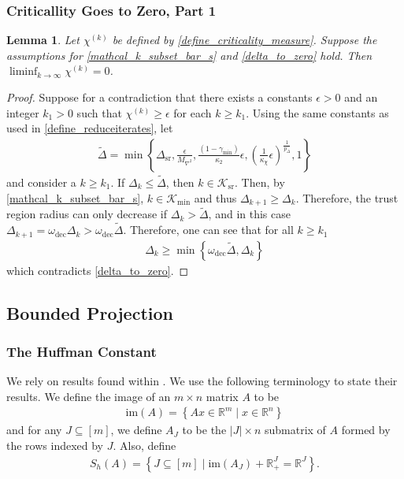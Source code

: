 \documentclass{article}
\newtheorem{lemma}[theorem]{Lemma}
\theoremstyle{case}
\numberwithin{theorem}{subsection}
\newcommand{\chik}{{\chi^{(k)}}}
\newcommand{\dk}{\Delta_k}
\newcommand{\dkpo}{\Delta_{k+1}}
\newcommand{\dsr}{{\Delta_{\textrm{sr}}}}
\newcommand{\gammasm}{\gamma_{\textrm{min}}}
\newcommand{\maxhessian}{{M_{\nabla^2}}}
\newcommand{\omegadec}{\omega_{\text{dec}}}
\newcommand{\reals}{\mathbb R}
\newcommand{\Rm}{\mathbb R^m}
\newcommand{\Rn}{\mathbb R^n}
\newcommand{\image}{{\textrm{im}}}
\newcommand{\miniterates}{{\mathcal K_{\textrm{min}}}}
\newcommand{\reduceiterates}{{\mathcal K_{\textrm{sr}}}}
\newcommand{\theirc}{{\kappa_2}}
\begin{document}
\subsubsection{Criticallity Goes to Zero, Part 1}
\begin{lemma}
\label{liminf_chi_to_zero}
Let $\chik$ be defined by \cref{define_criticality_measure}.
Suppose the assumptions for \cref{mathcal_k_subset_bar_s} and \cref{delta_to_zero} hold.
Then $\liminf_{k\to\infty} \chik = 0$.
\end{lemma}
 

\begin{proof}
Suppose for a contradiction that there exists a constants $\epsilon > 0$ and an integer $k_1 > 0$ such that $\chik \ge \epsilon$ for each $k \ge k_1$.
Using the same constants as used in \cref{define_reduceiterates}, let
\begin{align*}
\tilde \Delta = \min \left\{
\dsr, 
\frac{\epsilon}{\maxhessian}, 
\frac{(1 - \gammasm)}{\theirc} \epsilon,
\left(\frac 1 {\kappa_{\chi}} \epsilon \right)^{\frac 1 {p_{\Delta}}},
1\right\}
\end{align*}
and consider a $k \ge k_1$.
If $\dk \le \tilde \Delta$, then $k \in \reduceiterates$.
Then, by \cref{mathcal_k_subset_bar_s},  $k \in \miniterates$ and thus $\dkpo \ge \dk$.
Therefore, the trust region radius can only decrease if $\dk > \tilde \Delta$, and in this case $\dkpo = \omegadec\dk > \omegadec \tilde \Delta$.
Therefore, one can see that for all $k \ge k_1$
\begin{align}
\dk \ge \min\left\{\omegadec \tilde \Delta, \dk \right\}
\end{align}
which contradicts \cref{delta_to_zero}.
\end{proof}



\subsection{Bounded Projection}
\label{bounding_the_projection_section}

\subsubsection{The Huffman Constant}

We rely on results found within \cite{pena2020new}.
We use the following terminology to state their results.
We define the image of an $m\times n$ matrix $A$ to be
\begin{align}
\image(A) = \left\{Ax \in \Rm \;|\; x \in \Rn \right\} \label{define_image}
\end{align}
and for any $J \subseteq [m]$, we define $A_J$ to be the $|J| \times n$ submatrix of $A$ 
formed by the rows indexed by $J$.
Also, define 
\begin{align}
S_h(A) = \left\{J \subseteq [m] \; | \; \image(A_J) + \reals_+^J = \reals^J \right\}. \label{define_huff_subsets}
\end{align}
\end{document}
